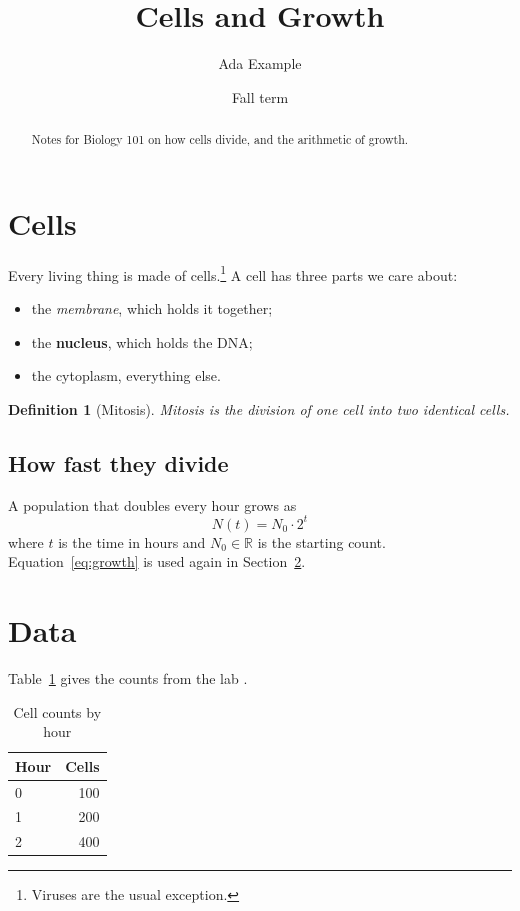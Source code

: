 \documentclass[11pt]{article}
\title{Cells and Growth}
\author{Ada Example}
\date{Fall term}
\newcommand{\course}{Biology 101}
\newcommand{\R}{\mathbb{R}}
\newtheorem{definition}{Definition}
\begin{document}
\maketitle

\begin{abstract}
Notes for \course{} on how cells divide, and the arithmetic of growth.
\end{abstract}

\section{Cells}\label{sec:cells}
Every living thing is made of cells.\footnote{Viruses are the usual exception.}
A cell has three parts we care about:
\begin{itemize}
  \item the \emph{membrane}, which holds it together;
  \item the \textbf{nucleus}, which holds the DNA;
  \item the cytoplasm, everything else.
\end{itemize}

\begin{definition}[Mitosis]\label{def:mitosis}
Mitosis is the division of one cell into two identical cells.
\end{definition}

\subsection{How fast they divide}
A population that doubles every hour grows as
\begin{equation}\label{eq:growth}
  N(t) = N_0 \cdot 2^{t}
\end{equation}
where $t$ is the time in hours and $N_0 \in \R$ is the starting count.
Equation~\eqref{eq:growth} is used again in Section~\ref{sec:data}.

\section{Data}\label{sec:data}
Table~\ref{tab:counts} gives the counts from the lab
\cite[p.~12]{doe2020}.

\begin{table}[h]
  \centering
  \caption{Cell counts by hour}\label{tab:counts}
  \begin{tabular}{lr}
    \toprule
    Hour & Cells \\
    \midrule
    0 & 100 \\
    1 & 200 \\
    2 & 400 \\
    \bottomrule
  \end{tabular}
\end{table}


\end{document}
